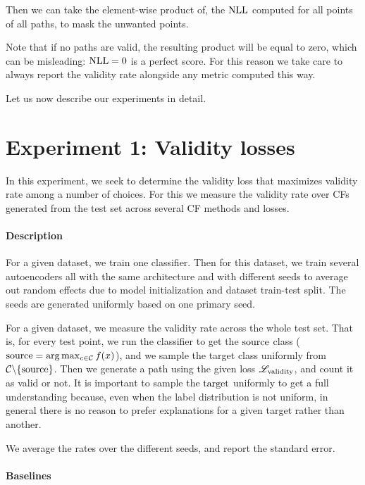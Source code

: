 \documentclass[../main.tex]{subfiles}
\begin{document}
Then we can take the element-wise product of, \eg{} the $\text{NLL}$ computed for all points of all paths, to mask the unwanted points.

Note that if no paths are valid, the resulting product will be equal to zero, which can be misleading: $\text{NLL} = 0$ is a perfect score.
For this reason we take care to always report the validity rate alongside any metric computed this way.

Let us now describe our experiments in detail.

\section{Experiment 1: Validity losses}

In this experiment, we seek to determine the validity loss that maximizes validity rate among a number of choices.
For this we measure the validity rate over CFs generated from the test set across several CF methods and losses.

\paragraph{Description}
\label{validity_losses/description}

For a given dataset, we train one classifier.
Then for this dataset, we train several autoencoders all with the same architecture and with different seeds to average out random effects due to model initialization and dataset train-test split.
The seeds are generated uniformly based on one primary seed.

For a given dataset, we measure the validity rate across the whole test set.
That is, for every test point, we run the classifier to get the $\mathrm{source}$ class ($\mathrm{source} = \arg\max_{c \in \mathcal{C}} f(x)$), and we sample the target class uniformly from $\mathcal{C} \backslash \{\mathrm{source}\}$.
Then we generate a path using the given loss $\mathscr{L}_\text{validity}$, and count it as valid or not.
It is important to sample the $\mathrm{target}$ uniformly to get a full understanding because, even when the label distribution is not uniform, in general there is no reason to prefer explanations for a given target rather than another.

We average the rates over the different seeds, and report the standard error.

\paragraph{Baselines}
\end{document}

